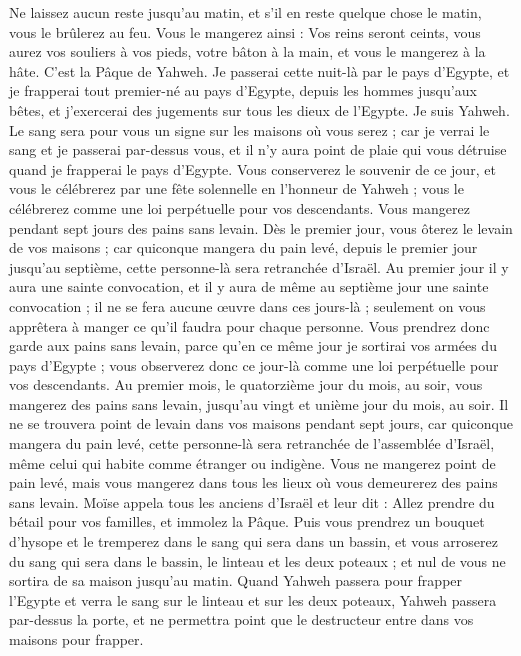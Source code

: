 \begin{multicols}{2}
Ne laissez aucun reste jusqu’au matin, et s'il en reste quelque chose le matin, vous le brûlerez au feu.
Vous le mangerez ainsi : Vos reins seront ceints, vous aurez vos souliers à vos pieds, votre bâton à la main, et vous le mangerez à la hâte. C'est la Pâque de Yahweh.
Je passerai cette nuit-là par le pays d'Egypte, et je frapperai tout premier-né au pays d'Egypte, depuis les hommes jusqu’aux bêtes, et j'exercerai des jugements sur tous les dieux de l'Egypte. Je suis Yahweh.
Le sang sera pour vous un signe sur les maisons où vous serez ; car je verrai le sang et je passerai par-dessus vous, et il n'y aura point de plaie qui vous détruise quand je frapperai le pays d'Egypte.
Vous conserverez le souvenir de ce jour, et vous le célébrerez par une fête solennelle en l’honneur de Yahweh ; vous le célébrerez comme une loi perpétuelle pour vos descendants.
Vous mangerez pendant sept jours des pains sans levain. Dès le premier jour, vous ôterez le levain de vos maisons ; car quiconque mangera du pain levé, depuis le premier jour jusqu’au septième, cette personne-là sera retranchée d'Israël.
Au premier jour il y aura une sainte convocation, et il y aura de même au septième jour une sainte convocation ; il ne se fera aucune œuvre dans ces jours-là ; seulement on vous apprêtera à manger ce qu'il faudra pour chaque personne.
Vous prendrez donc garde aux pains sans levain, parce qu'en ce même jour je sortirai vos armées du pays d'Egypte ; vous observerez donc ce jour-là comme une loi perpétuelle pour vos descendants.
Au premier mois, le quatorzième jour du mois, au soir, vous mangerez des pains sans levain, jusqu'au vingt et unième jour du mois, au soir.
Il ne se trouvera point de levain dans vos maisons pendant sept jours, car quiconque mangera du pain levé, cette personne-là sera retranchée de l’assemblée d'Israël, même celui qui habite comme étranger ou indigène.
Vous ne mangerez point de pain levé, mais vous mangerez dans tous les lieux où vous demeurerez des pains sans levain.
Moïse appela tous les anciens d'Israël et leur dit : Allez prendre du bétail pour vos familles, et immolez la Pâque.
Puis vous prendrez un bouquet d'hysope et le tremperez dans le sang qui sera dans un bassin, et vous arroserez du sang qui sera dans le bassin, le linteau et les deux poteaux ; et nul de vous ne sortira de sa maison jusqu'au matin.
Quand Yahweh passera pour frapper l'Egypte et verra le sang sur le linteau et sur les deux poteaux, Yahweh passera par-dessus la porte, et ne permettra point que le destructeur entre dans vos maisons pour frapper.

\end{multicols}
